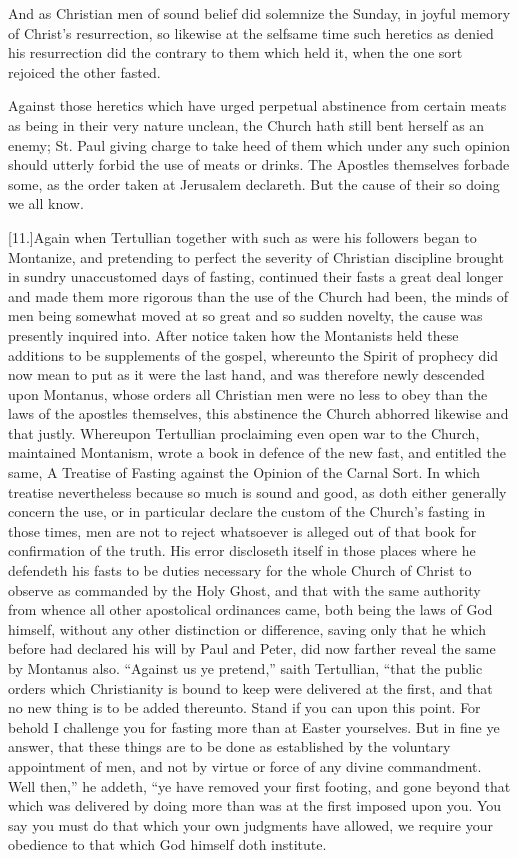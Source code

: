 And as Christian men of sound belief did solemnize the Sunday, in joyful memory of Christ’s resurrection, so likewise at the selfsame time such heretics as denied his resurrection did the contrary to them which held it, when the one sort rejoiced the other fasted.

Against those heretics which have urged perpetual abstinence from certain meats as being in their very nature unclean, the Church hath still bent herself as an enemy; St. Paul giving charge to take heed of them which under any such opinion should utterly forbid the use of meats or drinks. The Apostles themselves forbade some, as the order taken at Jerusalem declareth. But the cause of their so doing we all know.

[11.]Again when Tertullian together with such as were his followers began to Montanize, and pretending to perfect the severity of Christian discipline brought in sundry unaccustomed days of fasting, continued their fasts a great deal longer and made them more rigorous than the use of the Church had been, the minds of men being somewhat moved at so great and so sudden novelty, the cause was presently inquired into. After notice taken how the Montanists held  these additions to be supplements of the gospel, whereunto the Spirit of prophecy did now mean to put as it were the last hand, and was therefore newly descended upon Montanus, whose orders all Christian men were no less to obey than the laws of the apostles themselves, this abstinence the Church abhorred likewise and that justly. Whereupon Tertullian proclaiming even open war to the Church, maintained Montanism, wrote a book in defence of the new fast, and entitled the same, A Treatise of Fasting against the Opinion of the Carnal Sort. In which treatise nevertheless because so much is sound and good, as doth either generally concern the use, or in particular declare the custom of the Church’s fasting in those times, men are not to reject whatsoever is alleged out of that book for confirmation of the truth. His error discloseth itself in those places where he defendeth his fasts to be duties necessary for the whole Church of Christ to observe as commanded by the Holy Ghost, and that with the same authority from whence all other apostolical ordinances came, both being the laws of God himself, without any other distinction or difference, saving only that he which before had declared his will by Paul and Peter, did now farther reveal the same by Montanus also. “Against us ye pretend,” saith Tertullian, “that the public orders which Christianity is bound to keep were delivered at the first, and that no new thing is to be added thereunto. Stand if you can upon this point. For behold I challenge you for fasting more than at Easter yourselves. But in fine ye answer, that these things are to be done as established by the voluntary appointment of men, and not by virtue or force of any divine commandment. Well then,” he addeth, “ye have removed your first footing, and gone beyond that which was delivered by doing more than was at the first imposed upon you. You say you must do that which your own judgments have allowed,  we require your obedience to that which God himself doth institute.
